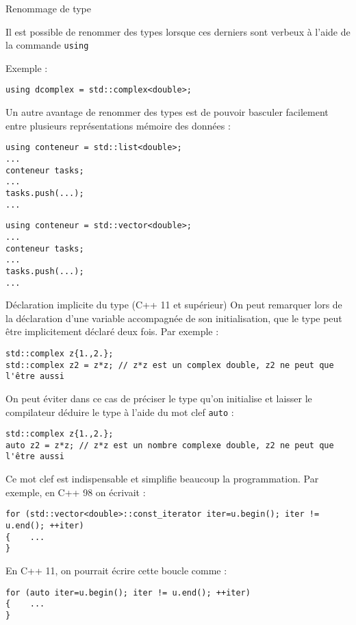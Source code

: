 \documentclass[compress,10pt,aspectratio=169]{beamer}
\begin{document}
\begin{frame}[fragile]{Renommage de type}
    \scriptsize

    Il est possible de renommer des types lorsque ces derniers sont verbeux à l'aide de la commande \texttt{using}

    \begin{exampleblock}{\small Exemple :}
\begin{verbatim}
using dcomplex = std::complex<double>;
\end{verbatim}
    \end{exampleblock}

    Un autre avantage de renommer des types est de pouvoir basculer facilement entre plusieurs représentations mémoire des données :

\begin{multicols}{2}
\begin{verbatim}
using conteneur = std::list<double>;
... 
conteneur tasks;
...
tasks.push(...);
...
\end{verbatim}
\columnbreak
\begin{verbatim}
using conteneur = std::vector<double>;
... 
conteneur tasks;
...
tasks.push(...);
...
\end{verbatim}
\end{multicols}
\end{frame}


\begin{frame}[fragile]{Déclaration implicite du type (C++ 11 et supérieur)}
    \scriptsize
    On peut remarquer lors de la déclaration d'une variable accompagnée de son initialisation, que le type peut être implicitement déclaré deux fois. Par exemple :
    \begin{verbatim}
std::complex z{1.,2.};
std::complex z2 = z*z; // z*z est un complex double, z2 ne peut que l'être aussi
    \end{verbatim}

    On peut éviter dans ce cas de préciser le type qu'on initialise et laisser le compilateur déduire le type à l'aide du mot clef \texttt{auto} :
    \begin{verbatim}
std::complex z{1.,2.};
auto z2 = z*z; // z*z est un nombre complexe double, z2 ne peut que l'être aussi  
    \end{verbatim}

Ce mot clef est indispensable et simplifie beaucoup la programmation. Par exemple, en C++ 98 on écrivait :
\begin{verbatim}
for (std::vector<double>::const_iterator iter=u.begin(); iter != u.end(); ++iter)
{    ...
}
\end{verbatim}
En C++ 11, on pourrait écrire cette boucle comme :
\begin{verbatim}
for (auto iter=u.begin(); iter != u.end(); ++iter)
{    ...
}
\end{verbatim}        
\end{frame}
\end{document}
